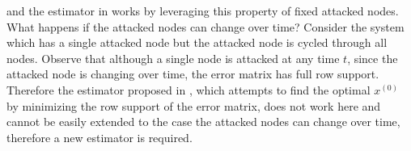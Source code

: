 \documentclass[../../thesis.tex]{subfiles}
\begin{document}
and the estimator in \cite{Fawzi2014} works by leveraging this property of fixed attacked nodes. \\
What happens if the attacked nodes can change over time? Consider the system which has a single attacked node but the attacked node is cycled through all nodes. 
Observe that although a single node is attacked at any time $t$, since the attacked node is changing over time, the error matrix has full row support. Therefore the estimator proposed in \cite{Fawzi2014}, which attempts to find the optimal $x^{(0)}$ by minimizing the row support of the error matrix, does not work here and cannot be easily extended to the case the attacked nodes can change over time, therefore a new estimator is required.
\end{document}
